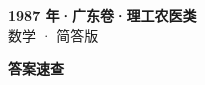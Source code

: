 \documentclass[zihao=-4, a4paper]{ctexart}
\begin{document}
\begin{center}
  {\Large\bfseries 1987 年·广东卷·理工农医类}\\[4pt]
  {\large 数学 · 简答版}
\end{center}
\medskip
{}

\clearpage
{}
\begin{center}{\Large\bfseries 答案速查}\end{center}
\medskip

\end{document}
